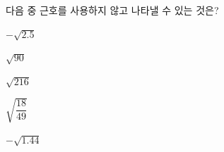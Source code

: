 다음 중 근호를 사용하지 않고 나타낼 수 있는 것은?
\begin{choices32}{\rule[-3ex]{0pt}{8ex}$-\sqrt{2.5}$}{\rule[-3ex]{0pt}{8ex}$\sqrt{90}$}{\rule[-3ex]{0pt}{8ex}$\sqrt{216}$}{\rule[-3ex]{0pt}{8ex}$\sqrt{\dfrac{18}{49}}$}{\rule[-3ex]{0pt}{8ex}$-\sqrt{1.44}$}\end{choices32}
